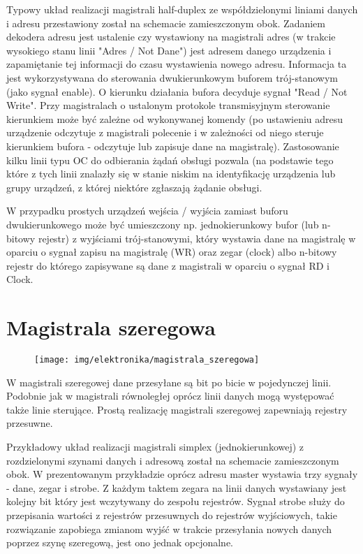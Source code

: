 \documentclass{pdfBooklets}
\begin{document}
Typowy układ realizacji magistrali half-duplex ze współdzielonymi liniami danych i adresu przestawiony został na schemacie zamieszczonym obok.
Zadaniem dekodera adresu jest ustalenie czy wystawiony na magistrali adres (w trakcie wysokiego stanu linii "Adres / Not Dane") jest adresem danego urządzenia i zapamiętanie tej informacji do czasu wystawienia nowego adresu. Informacja ta jest wykorzystywana do sterowania dwukierunkowym buforem trój-stanowym (jako sygnał enable).
O kierunku działania bufora decyduje sygnał "Read / Not Write". Przy magistralach o ustalonym protokole transmisyjnym sterowanie kierunkiem może być zależne od wykonywanej komendy (po ustawieniu adresu urządzenie odczytuje z magistrali polecenie i w zależności od niego steruje kierunkiem bufora - odczytuje lub zapisuje dane na magistralę).
Zastosowanie kilku linii typu OC do odbierania żądań obsługi pozwala (na podstawie tego które z tych linii znalazły się w stanie niskim na identyfikację urządzenia lub grupy urządzeń, z której niektóre zgłaszają żądanie obsługi.

W przypadku prostych urządzeń wejścia / wyjścia zamiast buforu dwukierunkowego może być umieszczony np.
jednokierunkowy bufor (lub n-bitowy rejestr) z wyjściami trój-stanowymi, który wystawia dane na magistralę w oparciu o sygnał zapisu na magistralę (WR) oraz zegar (clock) albo
n-bitowy rejestr do którego zapisywane są dane z magistrali w oparciu o sygnał RD i Clock.

\section{Magistrala szeregowa}

\begin{figure}\begin{center}
    \texttt{[image: img/elektronika/magistrala\_szeregowa]}
\end{center}\end{figure}
W magistrali szeregowej dane przesyłane są bit po bicie w pojedynczej linii. Podobnie jak w magistrali równoległej oprócz linii danych mogą występować także linie sterujące. Prostą realizację magistrali szeregowej zapewniają rejestry przesuwne.

Przykładowy układ realizacji magistrali simplex (jednokierunkowej) z rozdzielonymi szynami danych i adresową został na schemacie zamieszczonym obok.
W prezentowanym przykładzie oprócz adresu master wystawia trzy sygnały - dane, zegar i strobe. Z każdym taktem zegara na linii danych wystawiany jest kolejny bit który jest wczytywany do zespołu rejestrów. Sygnał strobe służy do przepisania wartości z rejestrów przesuwnych do rejestrów wyjściowych, takie rozwiązanie zapobiega zmianom wyjść w trakcie przesyłania nowych danych poprzez szynę szeregową, jest ono jednak opcjonalne.
\end{document}
